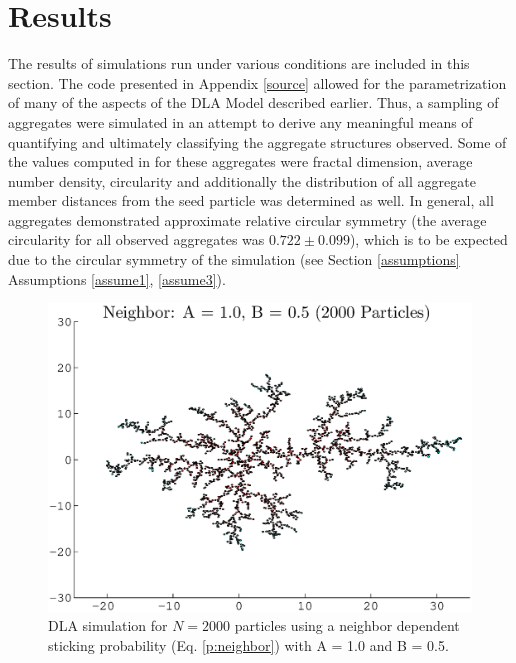 \documentclass{article}
\begin{document}
\section{Results}

The results of simulations run under various conditions are included in this section. The code presented in Appendix \ref{source} allowed for the parametrization of many of the aspects of the DLA Model described earlier. Thus, a sampling of aggregates were simulated in an attempt to derive any meaningful means of quantifying and ultimately classifying the aggregate structures observed. Some of the values computed in for these aggregates were fractal dimension, average number density, circularity and additionally the distribution of all aggregate member distances from the seed particle was determined as well. In general, all aggregates demonstrated approximate relative circular symmetry (the average circularity for all observed aggregates was $0.722 \pm 0.099$), which is to be expected due to the circular symmetry of the simulation (see Section \ref{assumptions} Assumptions \ref{assume1}, \ref{assume3}).


\begin{figure}
\begin{center}
	\includegraphics[width=\textwidth]{neigh_1005.eps}
	\caption{DLA simulation for $N=2000$ particles using a neighbor dependent sticking probability (Eq. \ref{p:neighbor}) with A = 1.0 and B = 0.5. }
	\label{fig:neigh}
\end{center}
\end{figure}
\end{document}
